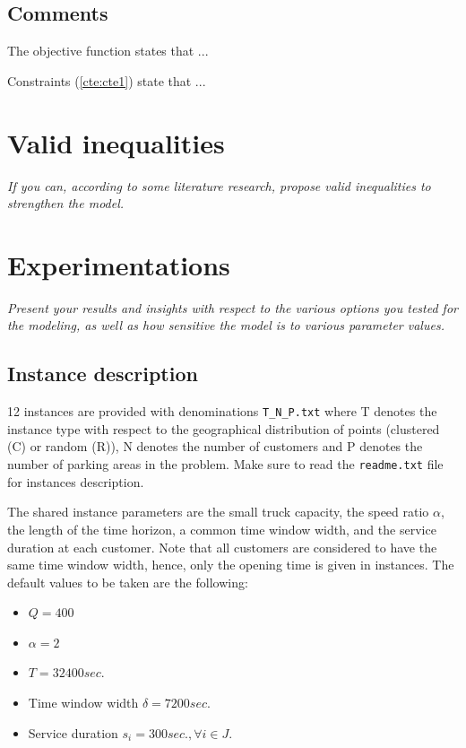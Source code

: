 \documentclass[dvipsnames,authoryear,11pt]{article}
\newcommand{\refp}[1]{(\ref{#1})}
\begin{document}
\subsection{Comments}
 
The objective function states that ...

 
Constraints \refp{cte:cte1} state that ...




\section{Valid inequalities}

\textit{If you can, according to some literature research, propose valid inequalities to strengthen the model.}


\section{Experimentations}

\textit{Present your results and insights with respect to the various options you tested for the modeling, as well as how sensitive the model is to various parameter values.}

\subsection{Instance description}

12 instances are provided with denominations \texttt{T\_N\_P.txt} where T denotes the instance type with respect to the geographical distribution of points (clustered (C) or random (R)), N denotes the number of customers and P denotes the number of parking areas in the problem. Make sure to read the \texttt{readme.txt} file for instances description.

The shared instance parameters are the small truck capacity, the speed ratio $\alpha$, the length of the time horizon, a common time window width, and the service duration at each customer. Note that all customers are considered to have the same time window width, hence, only the opening time is given in instances.
The default values to be taken are the following: 
\begin{itemize}
	\item $Q = 400$
	\item $\alpha = 2$ 
	\item $T=32400 sec.$
	\item Time window width $\delta=7200 sec.$
	\item Service duration $s_i=300 sec., \forall i \in J$.
\end{itemize} 
\end{document}

